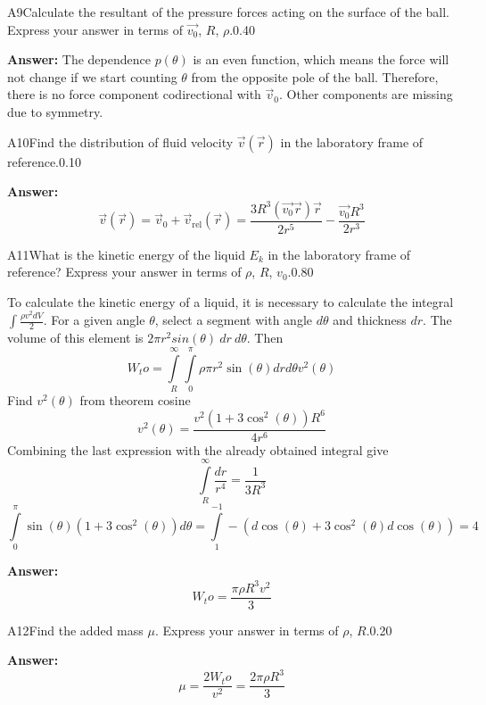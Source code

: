 \documentclass[11pt,a4paper]{article}
\begin{document}
\begin{solcard}{A9}{Calculate the resultant of the pressure forces acting on the surface of the ball. Express your answer in terms of $\vec{v_0}$, $R$, $\rho$.}{0.40}
\par\smallskip\noindent\textbf{Answer:} The dependence $p(\theta)$ is an even function, which means the force will not change if we start counting $\theta$ from the opposite pole of the ball. Therefore, there is no force component codirectional with $\vec{v}_0$. Other components are missing due to symmetry.
\end{solcard}

\begin{solcard}{A10}{Find the distribution of fluid velocity $\vec{v}(\vec{r})$ in the laboratory frame of reference.}{0.10}
\par\smallskip\noindent\textbf{Answer:} $$\vec{v}(\vec{r}) = \vec{v}_0 + \vec{v}_{\text{rel}}(\vec{r}) = \frac{3R^3(\vec{v_0}\vec{r})\vec{r}}{2r^5}-\frac{\vec{v_0}R^3}{2r^3}$$
\end{solcard}

\begin{solcard}{A11}{What is the kinetic energy of the liquid $E_k$ in the laboratory frame of reference? Express your answer in terms of $\rho$, $R$, $v_0$.}{0.80}

To calculate the kinetic energy of a liquid, it is necessary to calculate the integral $\int\frac{\rho v^2 dV}{2}$. For a given angle $\theta$, select a segment with angle $d\theta$ and thickness $dr$. The volume of this element is $2\pi r^2sin(\theta)~dr~d{\theta}$. Then $$W_to=\int\limits_R^{\infty} \int\limits_0^\pi {\rho\pi}r^2 \sin (\theta)drd{\theta}{v^2({\theta})} $$Find ${v^2({\theta})}$ from theorem cosine $${v^2({\theta})}=\frac{v^2\left(1+3\cos^2(\theta)\right)R^6}{4r^6} $$Combining the last expression with the already obtained integral give $$\int\limits_R^{\infty} \frac{dr}{r^4}=\frac{1}{3R^3} $$$$\int\limits_0^{\pi} \sin(\theta)(1+3\cos^2(\theta))d{\theta}=\int\limits_1^{-1} -(d\cos(\theta)+3\cos^2(\theta)d\cos(\theta))=4 $$

\par\smallskip\noindent\textbf{Answer:} $$W_to=\frac{\pi \rho R^3v^2}{3} $$
\end{solcard}

\begin{solcard}{A12}{Find the added mass $\mu$. Express your answer in terms of $\rho$, $R$.}{0.20}
\par\smallskip\noindent\textbf{Answer:} $$\mu=\frac{2W_to}{v^2}=\frac{2\pi \rho R^3}{3} $$
\end{solcard}
\end{document}

